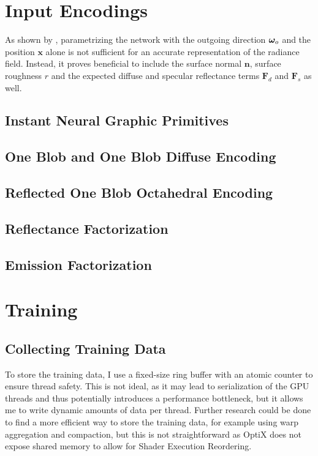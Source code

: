 \section{Input Encodings}

As shown by \textcite{ren2013}, parametrizing the network with the outgoing direction $\bm{\omega}_o$ and the position $\mathbf{x}$ alone is not sufficient for an accurate representation of the radiance field.
Instead, it proves beneficial to include the surface normal $\mathbf{n}$, surface roughness $r$ and the expected diffuse and specular reflectance terms $\mathbf{F}_d$ and $\mathbf{F}_s$ as well.

\subsection{Instant Neural Graphic Primitives}

\subsection{One Blob and One Blob Diffuse Encoding}

\begin{figure}
    \centering
    
\end{figure}

\subsection{Reflected One Blob Octahedral Encoding}

\subsection{Reflectance Factorization}

\subsection{Emission Factorization}

\section{Training}

\subsection{Collecting Training Data}

To store the training data, I use a fixed-size ring buffer with an atomic counter to ensure thread safety.
This is not ideal, as it may lead to serialization of the GPU threads and thus potentially introduces a performance bottleneck, but it allows me to write dynamic amounts of data per thread.
Further research could be done to find a more efficient way to store the training data, for example using warp aggregation and compaction, but this is not straightforward as OptiX does not expose shared memory to allow for Shader Execution Reordering.

